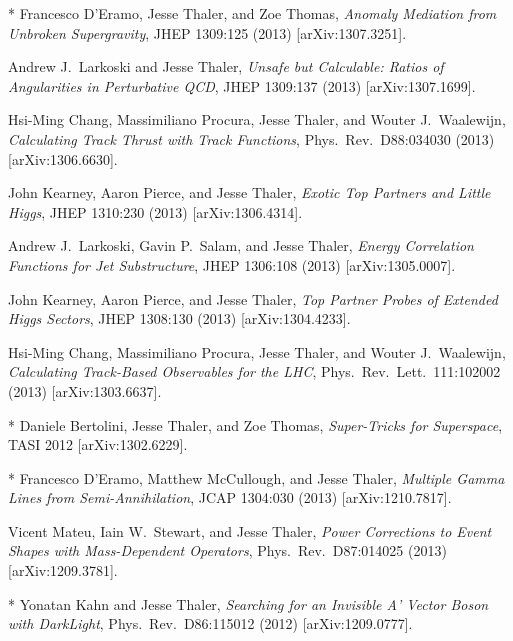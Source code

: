 \begin{list}{[]\addtocounter{jessecount}{-1}}{\leftmargin=3em \itemsep=4pt}
\item
* Francesco D'Eramo, Jesse Thaler, and Zoe Thomas,
\emph{Anomaly Mediation from Unbroken Supergravity},
JHEP 1309:125 (2013)
[arXiv:1307.3251].

\item
 Andrew J.\ Larkoski and Jesse Thaler,
\emph{Unsafe but Calculable: Ratios of Angularities in Perturbative QCD},
JHEP 1309:137 (2013)
[arXiv:1307.1699].

\item
 Hsi-Ming Chang, Massimiliano Procura, Jesse Thaler, and Wouter J.\ Waalewijn,
\emph{Calculating Track Thrust with Track Functions},
Phys.\ Rev.\ D88:034030 (2013)
[arXiv:1306.6630].

\item
 John Kearney, Aaron Pierce, and Jesse Thaler,
\emph{Exotic Top Partners and Little Higgs},
JHEP 1310:230 (2013)
[arXiv:1306.4314].

\item
 Andrew J.\ Larkoski, Gavin P.\ Salam, and Jesse Thaler,
\emph{Energy Correlation Functions for Jet Substructure},
JHEP 1306:108 (2013)
[arXiv:1305.0007].

\item
 John Kearney, Aaron Pierce, and Jesse Thaler,
\emph{Top Partner Probes of Extended Higgs Sectors},
JHEP 1308:130 (2013)
[arXiv:1304.4233].

\item
 Hsi-Ming Chang, Massimiliano Procura, Jesse Thaler, and Wouter J.\ Waalewijn,
\emph{Calculating Track-Based Observables for the LHC},
Phys.\ Rev.\ Lett.\ 111:102002 (2013)
[arXiv:1303.6637].

\item
* Daniele Bertolini, Jesse Thaler, and Zoe Thomas,
\emph{Super-Tricks for Superspace},
TASI 2012
[arXiv:1302.6229].

\item
* Francesco D'Eramo, Matthew McCullough, and Jesse Thaler,
\emph{Multiple Gamma Lines from Semi-Annihilation},
JCAP 1304:030 (2013)
[arXiv:1210.7817].

\item
 Vicent Mateu, Iain W.\ Stewart, and Jesse Thaler,
\emph{Power Corrections to Event Shapes with Mass-Dependent Operators},
Phys.\ Rev.\ D87:014025 (2013)
[arXiv:1209.3781].

\item
* Yonatan Kahn and Jesse Thaler,
\emph{Searching for an Invisible A' Vector Boson with DarkLight},
Phys.\ Rev.\ D86:115012 (2012)
[arXiv:1209.0777].


\end{list}
